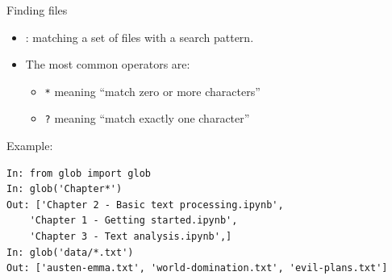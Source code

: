 \documentclass[aspectratio=169,usenames,dvipsnames]{beamer}
\begin{document}
\begin{frame}[fragile]{Finding files}
    \begin{itemize}
        \item {}: matching a set of files with a search pattern.
        \item The most common operators are:
            \begin{itemize}
                \item \texttt{*} meaning ``match zero or more characters''
                \item \texttt{?} meaning ``match exactly one character''
            \end{itemize}
    \end{itemize}
\pause
Example:
\begin{lstlisting}
In: from glob import glob
In: glob('Chapter*')
Out: ['Chapter 2 - Basic text processing.ipynb',
    'Chapter 1 - Getting started.ipynb',
    'Chapter 3 - Text analysis.ipynb',]
In: glob('data/*.txt')
Out: ['austen-emma.txt', 'world-domination.txt', 'evil-plans.txt']
\end{lstlisting}
\end{frame}
\end{document}
